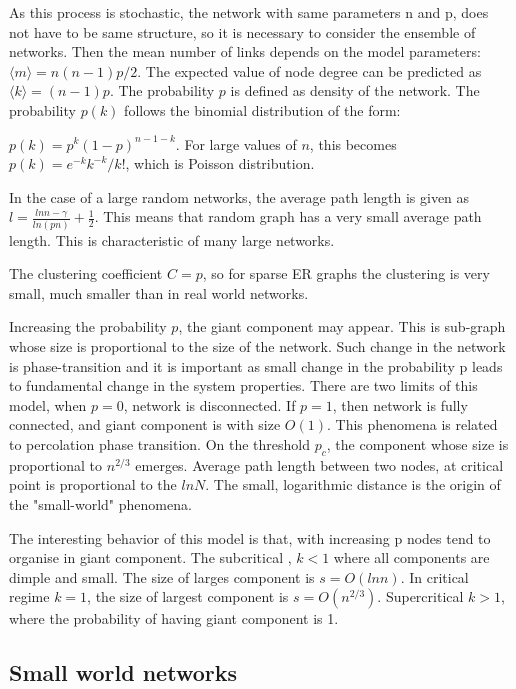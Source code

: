 As this process is stochastic, the network with same parameters n and p, does not have to be same structure, so it is necessary to consider the ensemble of networks. Then the mean number of links depends on the model parameters:
$\langle m \rangle = n(n-1)p / 2$. The expected value of node degree can be predicted as $\langle k \rangle = (n-1)p$.
The probability $p$ is defined as density of the network. 
The probability $p(k)$ follows the binomial distribution of the form:

$p(k) = p^k(1-p)^{n-1-k}$. For large values of $n$, this becomes $p(k) = e^{-k}k^{-k} / k!$, which is Poisson distribution. 

In the case of a large random networks, the average path length is given as $l = \frac{ln n - \gamma}{ln(pn)} + \frac{1}{2}$. This means that random graph has a very small average path length. This is characteristic of many large networks. 

The clustering coefficient $C=p$, so for sparse ER graphs the clustering is very small, much smaller than in real world networks.

Increasing the probability $p$, the giant component may appear. This is sub-graph whose size is proportional to the size of the network. Such change in the network is phase-transition and it is important as small change in the probability p leads to fundamental change in the system properties. There are two limits of this model, when $p=0$, network is disconnected. If $p=1$, then network is fully connected, and giant component is with size $O(1)$.  This phenomena is related to percolation phase transition. On the threshold $p_c$, the component whose size is proportional to $n^{2/3}$ emerges. Average path length between two nodes, at critical point is proportional to the $ln N$. The small, logarithmic distance is the origin of the "small-world" phenomena. 

The interesting behavior of this model is that, with increasing p nodes tend to organise in giant component. The subcritical , $k <1$ where all components are dimple and small. The size of larges component is $s=O(ln n)$. In critical regime $k=1$, the size of largest component is $s=O(n^{2/3})$. Supercritical $k>1$, where the probability of having giant component is 1.  


\subsection{Small world networks}

